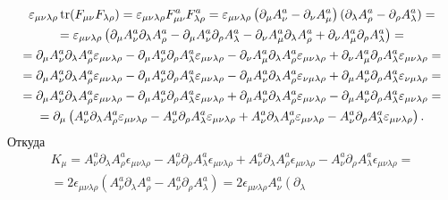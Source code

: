 \documentclass[a4paper]{article}
\begin{document}
\begin{sol}
\begin{multline*}
	\varepsilon_{\mu\nu\lambda\rho}\operatorname*{\mathop{tr}}(F_{\mu\nu}F_{\lambda\rho})=\varepsilon_{\mu\nu\lambda\rho}F_{\mu\nu}^aF_{\lambda\rho}^a=
	\varepsilon_{\mu\nu\lambda\rho}\left( \partial_\mu A_\nu^a
	-\partial_\nu A_\mu^a\right) (\partial_\lambda A^a_\rho-
	\partial_\rho A_\lambda^a)=\\=
	\varepsilon_{\mu\nu\lambda\rho}\left( 
	\partial_\mu A^a_\nu\partial_\lambda A^a_\rho-
\partial_\mu A_\nu^a \partial_\rho A_\lambda^a-
\partial_\nu A^a_\mu \partial_\lambda A^a_\rho+
\partial_\nu A_\mu^a\partial_\rho A^a_\lambda\right) =\\=
	\partial_\mu A^a_\nu\partial_\lambda A^a_\rho
	\varepsilon_{\mu\nu\lambda\rho} -
\partial_\mu A_\nu^a \partial_\rho A_\lambda^a\varepsilon_{\mu\nu\lambda\rho} -
\partial_\nu A^a_\mu \partial_\lambda A^a_\rho\varepsilon_{\mu\nu\lambda\rho} +
\partial_\nu A_\mu^a\partial_\rho A^a_\lambda\varepsilon_{\mu\nu\lambda\rho} =\\=
	\partial_\mu A^a_\nu\partial_\lambda A^a_\rho
	\varepsilon_{\mu\nu\lambda\rho} -
\partial_\mu A_\nu^a \partial_\rho A_\lambda^a\varepsilon_{\mu\nu\lambda\rho} -
\partial_\mu A^a_\nu \partial_\lambda A^a_\rho\varepsilon_{\nu\mu\lambda\rho} +
\partial_\mu A_\nu^a\partial_\rho A^a_\lambda\varepsilon_{\nu\mu\lambda\rho} =\\=
	\partial_\mu A^a_\nu\partial_\lambda A^a_\rho
	\varepsilon_{\mu\nu\lambda\rho} -
\partial_\mu A_\nu^a \partial_\rho A_\lambda^a\varepsilon_{\mu\nu\lambda\rho} +
\partial_\mu A^a_\nu \partial_\lambda A^a_\rho\varepsilon_{\mu\nu\lambda\rho} -
\partial_\mu A_\nu^a\partial_\rho A^a_\lambda\varepsilon_{\mu\nu\lambda\rho} =\\=
\partial_\mu \left(A^a_\nu\partial_\lambda A^a_\rho
	\varepsilon_{\mu\nu\lambda\rho} -
A_\nu^a \partial_\rho A_\lambda^a\varepsilon_{\mu\nu\lambda\rho} +
A^a_\nu \partial_\lambda A^a_\rho\varepsilon_{\mu\nu\lambda\rho} -
A_\nu^a\partial_\rho A^a_\lambda\varepsilon_{\mu\nu\lambda\rho}\right)
.\end{multline*} 
Откуда
\begin{multline*}
K_\mu=
A^a_\nu\partial_\lambda A^a_\rho
	\epsilon_{\mu\nu\lambda\rho} -
A_\nu^a \partial_\rho A_\lambda^a\epsilon_{\mu\nu\lambda\rho} +
A^a_\nu \partial_\lambda A^a_\rho\epsilon_{\mu\nu\lambda\rho} -
A_\nu^a\partial_\rho A^a_\lambda\epsilon_{\mu\nu\lambda\rho}=\\=
2\epsilon_{\mu\nu\lambda\rho}\left(A^a_{\nu}\partial_\lambda
A_\rho^a-A^a_\nu\partial_\rho A^a_\lambda\right) =
2\epsilon_{\mu\nu\lambda\rho}A^a_{\nu}\left(\partial_\lambda

\end{multline*}
\end{sol}
\end{document}

